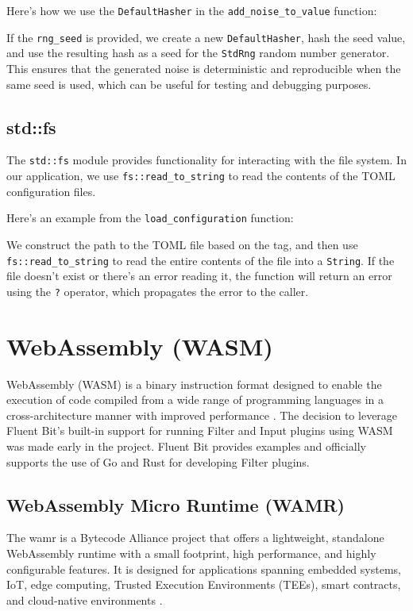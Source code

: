 Here's how we use the \lstinline|DefaultHasher| in the \texttt{add\_noise\_to\_value} function:



If the \texttt{rng\_seed} is provided, we create a new \texttt{DefaultHasher}, hash the seed value, and use the resulting hash as a seed for the \texttt{StdRng} random number generator. This ensures that the generated noise is deterministic and reproducible when the same seed is used, which can be useful for testing and debugging purposes.

\subsection{std::fs}
The \texttt{std::fs} module provides functionality for interacting with the file system. In our application, we use \texttt{fs::read\_to\_string} to read the contents of the TOML configuration files.

Here's an example from the \texttt{load\_configuration} function:



We construct the path to the TOML file based on the tag, and then use \texttt{fs::read\_to\_string} to read the entire contents of the file into a \texttt{String}. If the file doesn't exist or there's an error reading it, the function will return an error using the \texttt{?} operator, which propagates the error to the caller.

\section{WebAssembly (WASM)}
WebAssembly (WASM) is a binary instruction format designed to enable the execution of code compiled from a wide range of programming languages in a cross-architecture manner with improved performance \cite{Webassembly}. The decision to leverage Fluent Bit's built-in support for running Filter and Input plugins using WASM was made early in the project. Fluent Bit provides examples and officially supports the use of Go and Rust for developing Filter plugins.

\subsection{WebAssembly Micro Runtime (WAMR)}
The \acrfull{wamr} \cite{wamr-about} is a Bytecode Alliance project that offers a lightweight, standalone WebAssembly runtime with a small footprint, high performance, and highly configurable features. It is designed for applications spanning embedded systems, IoT, edge computing, Trusted Execution Environments (TEEs), smart contracts, and cloud-native environments \cite{wamr-docs}.

